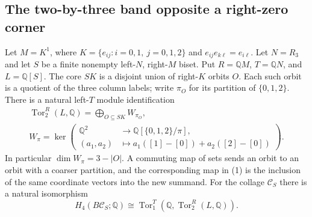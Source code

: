 \subsection{The two-by-three band opposite a right-zero corner}

\begin{lemma}
\label{CP2:A-two-by-three-core-partitions}
Let $M=K^1$, where
$K=\{e_{ij}:i=0,1,\ j=0,1,2\}$ and
$e_{ij}e_{k\ell}=e_{i\ell}$.  Let $N=R_3$ and let $S$
be a finite nonempty left-$N$, right-$M$ biset.
Put $R=\mathbb QM$, $T=\mathbb QN$, and $L=\mathbb Q[S]$.
The core $SK$ is a disjoint union of right-$K$ orbits $O$.
Each such orbit is a quotient of the three column labels;
write $\pi_O$ for its partition of $\{0,1,2\}$.
There is a natural left-$T$ module identification
\[
 \begin{gathered}
 \operatorname{Tor}^{R}_2(L,\mathbb Q)
   =\bigoplus_{O\subseteq SK}W_{\pi_O},\\
 W_\pi=\ker\!\left(
  \begin{aligned}
  \mathbb Q^2&\longrightarrow\mathbb Q[\{0,1,2\}/\pi],\\
  (a_1,a_2)&\longmapsto
       a_1([1]-[0])+a_2([2]-[0])
  \end{aligned}\right).
 \end{gathered}
                                                               \tag{1}
\]
In particular $\dim W_\pi=3-|O|$.  A commuting map of
sets sends an orbit to an orbit with a coarser partition,
and the corresponding map in (1) is the inclusion of
the same coordinate vectors into the new summand.
For the collage $\mathcal C_S$ there is a natural isomorphism
\[
 H_4(B\mathcal C_S;\mathbb Q)
 \cong
 \operatorname{Tor}^{T}_1\!\left(
      \mathbb Q,\operatorname{Tor}^{R}_2(L,\mathbb Q)\right).
                                                               \tag{2}
\]
\end{lemma}
